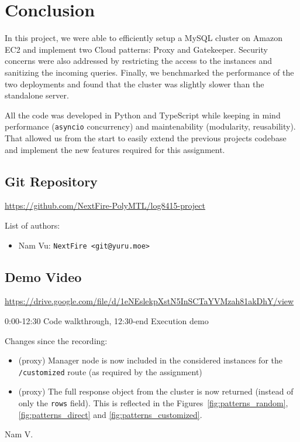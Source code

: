 \documentclass[letterpaper,headings=standardclasses,parskip=half]{scrartcl}
\begin{document}
\section{Conclusion}

In this project, we were able to efficiently setup a MySQL cluster on Amazon EC2 and implement two Cloud patterns: Proxy and Gatekeeper. Security concerns were also addressed by restricting the access to the instances and sanitizing the incoming queries. Finally, we benchmarked the performance of the two deployments and found that the cluster was slightly slower than the standalone server.

All the code was developed in Python and TypeScript while keeping in mind performance (\texttt{asyncio} concurrency) and maintenability (modularity, reusability). That allowed us from the start to easily extend the previous projects codebase and implement the new features required for this assignment.


\subsection*{Git Repository}

\url{https://github.com/NextFire-PolyMTL/log8415-project}

List of authors:

\begin{itemize}
    \item Nam Vu: \texttt{NextFire <git@yuru.moe>}
\end{itemize}

\subsection*{Demo Video}

\url{https://drive.google.com/file/d/1eNEslekpXstN5InSCTaYVMzah81akDhY/view}

0:00-12:30 Code walkthrough, 12:30-end Execution demo

Changes since the recording:

\begin{itemize}
    \item (proxy) Manager node is now included in the considered instances for the \texttt{/customized} route (as required by the assignment)
    \item (proxy) The full response object from the cluster is now returned (instead of only the \texttt{rows} field). This is reflected in the Figures~\ref{fig:patterns_random}, \ref{fig:patterns_direct} and \ref{fig:patterns_customized}.
\end{itemize}


Nam V.

\end{document}
